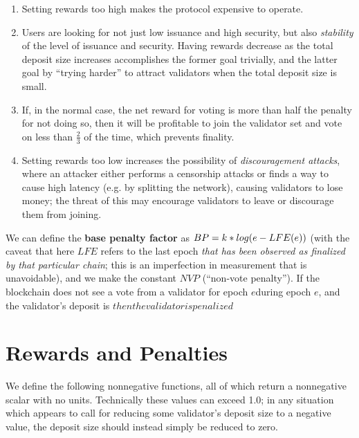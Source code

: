 \documentclass[12pt, final]{article}
\newcommand{\epoch}{\ensuremath{e}\space}
\begin{document}
\begin{enumerate}
\item Setting rewards too high makes the protocol expensive to operate.
\item Users are looking for not just low issuance and high security, but also \textit{stability} of the level of issuance and security. Having rewards decrease as the total deposit size increases accomplishes the former goal trivially, and the latter goal by ``trying harder'' to attract validators when the total deposit size is small.
\item If, in the normal case, the net reward for voting is more than half the penalty for not doing so, then it will be profitable to join the validator set and vote on less than $\frac{2}{3}$ of the time, which prevents finality.
\item Setting rewards too low increases the possibility of \textit{discouragement attacks}, where an attacker either performs a censorship attacks or finds a way to cause high latency (e.g. by splitting the network), causing validators to lose money; the threat of this may encourage validators to leave or discourage them from joining.
\end{enumerate}

We can define the \textbf{base penalty factor} as $BP = k * log(\epoch - LFE(\epoch))$ (with the caveat that here $LFE$ refers to the last epoch \textit{that has been observed as finalized by that particular chain}; this is an imperfection in measurement that is unavoidable), and we make the constant $NVP$ (``non-vote penalty''). If the blockchain does not see a vote from a validator for epoch \epoch during epoch \epoch, and the validator's deposit is $ then the validator is penalized $

\section{Rewards and Penalties}

We define the following nonnegative functions, all of which return a nonnegative scalar with no units. Technically these values can exceed 1.0; in any situation which appears to call for reducing some validator's deposit size to a negative value, the deposit size should instead simply be reduced to zero.
\end{document}
